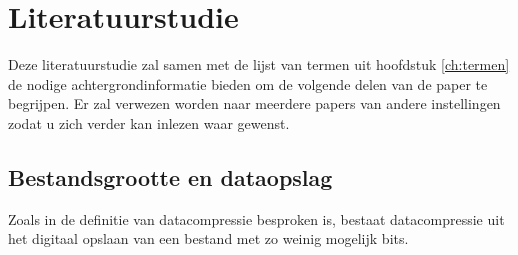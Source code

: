 \chapter{Literatuurstudie}
\label{ch:literatuurstudie}


Deze literatuurstudie zal samen met de lijst van termen uit hoofdstuk \ref{ch:termen} de nodige achtergrondinformatie bieden om de volgende delen van de paper te begrijpen. Er zal verwezen worden naar meerdere papers van andere instellingen zodat u zich verder kan inlezen waar gewenst.







\section{Bestandsgrootte en dataopslag}
\label{sec:bestandsgrootte-dataopslag}
Zoals in de definitie van \gls{datacompressie} besproken is, bestaat \gls{datacompressie} uit het digitaal opslaan van een bestand met zo weinig mogelijk \glspl{bit}.


